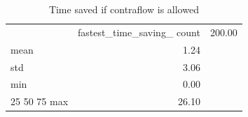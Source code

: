 \begin{table}
\caption{Time saved if contraflow is allowed}
\label{tab:T6b_contraflow_saving}
\begin{tabular}{lr}
\toprule
 & fastest_time_saving_%
\midrule
count & 200.00 \\
mean & 1.24 \\
std & 3.06 \\
min & 0.00 \\
25%
50%
75%
max & 26.10 \\
\bottomrule
\end{tabular}
\end{table}
